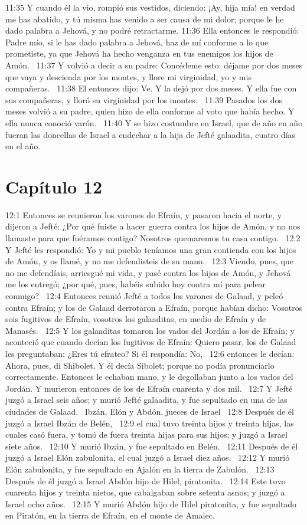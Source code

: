 11:35 Y cuando él la vio, rompió sus vestidos, diciendo: ¡Ay, hija mía! en verdad me has abatido, y tú misma has venido a ser causa de mi dolor; porque le he dado palabra a Jehová, y no podré retractarme. 
11:36 Ella entonces le respondió: Padre mío, si le has dado palabra a Jehová, haz de mí conforme a lo que prometiste, ya que Jehová ha hecho venganza en tus enemigos los hijos de Amón.  
11:37 Y volvió a decir a su padre: Concédeme esto: déjame por dos meses que vaya y descienda por los montes, y llore mi virginidad, yo y mis compañeras.  
11:38 El entonces dijo: Ve. Y la dejó por dos meses. Y ella fue con sus compañeras, y lloró su virginidad por los montes.  
11:39 Pasados los dos meses volvió a su padre, quien hizo de ella conforme al voto que había hecho. Y ella nunca conoció varón.  
11:40 Y se hizo costumbre en Israel, que de año en año fueran las doncellas de Israel a endechar a la hija de Jefté galaadita, cuatro días en el año.  
\section*{Capítulo 12}

12:1 Entonces se reunieron los varones de Efraín, y pasaron hacia el norte, y dijeron a Jefté: ¿Por qué fuiste a hacer guerra contra los hijos de Amón, y no nos llamaste para que fuéramos contigo? Nosotros quemaremos tu casa contigo.  
12:2 Y Jefté les respondió: Yo y mi pueblo teníamos una gran contienda con los hijos de Amón, y os llamé, y no me defendisteis de su mano.  
12:3 Viendo, pues, que no me defendíais, arriesgué mi vida, y pasé contra los hijos de Amón, y Jehová me los entregó; ¿por qué, pues, habéis subido hoy contra mí para pelear conmigo?  
12:4 Entonces reunió Jefté a todos los varones de Galaad, y peleó contra Efraín; y los de Galaad derrotaron a Efraín, porque habían dicho: Vosotros sois fugitivos de Efraín, vosotros los galaaditas, en medio de Efraín y de Manasés.  
12:5 Y los galaaditas tomaron los vados del Jordán a los de Efraín; y aconteció que cuando decían los fugitivos de Efraín: Quiero pasar, los de Galaad les preguntaban: ¿Eres tú efrateo? Si él respondía: No,  
12:6 entonces le decían: Ahora, pues, di Shibolet. Y él decía Sibolet; porque no podía pronunciarlo correctamente. Entonces le echaban mano, y le degollaban junto a los vados del Jordán. Y murieron entonces de los de Efraín cuarenta y dos mil.  
12:7 Y Jefté juzgó a Israel seis años; y murió Jefté galaadita, y fue sepultado en una de las ciudades de Galaad.  
Ibzán, Elón y Abdón, jueces de Israel  
12:8 Después de él juzgó a Israel Ibzán de Belén,  
12:9 el cual tuvo treinta hijos y treinta hijas, las cuales casó fuera, y tomó de fuera treinta hijas para sus hijos; y juzgó a Israel siete años.  
12:10 Y murió Ibzán, y fue sepultado en Belén.  
12:11 Después de él juzgó a Israel Elón zabulonita, el cual juzgó a Israel diez años.  
12:12 Y murió Elón zabulonita, y fue sepultado en Ajalón en la tierra de Zabulón.  
12:13 Después de él juzgó a Israel Abdón hijo de Hilel, piratonita.  
12:14 Este tuvo cuarenta hijos y treinta nietos, que cabalgaban sobre setenta asnos; y juzgó a Israel ocho años.  
12:15 Y murió Abdón hijo de Hilel piratonita, y fue sepultado en Piratón, en la tierra de Efraín, en el monte de Amalec.  
